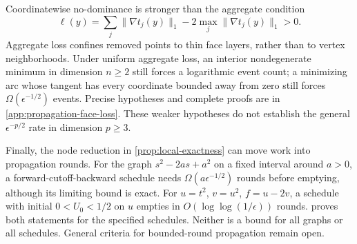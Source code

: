Coordinatewise no-dominance is stronger than the aggregate condition
\[
 \ell(y)=\sum_j\|\nabla t_j(y)\|_1
                  -2\max_j\|\nabla t_j(y)\|_1>0.
\]
Aggregate loss confines removed points to thin face layers, rather than
to vertex neighborhoods. Under uniform aggregate loss, an interior
nondegenerate minimum in dimension $n\ge2$ still forces a logarithmic
event count; a minimizing arc whose tangent has every coordinate bounded
away from zero still forces $\Omega(\epsilon^{-1/2})$ events. Precise
hypotheses and complete proofs are in \cref{app:propagation-face-loss}.
These weaker hypotheses do not establish the general
$\epsilon^{-p/2}$ rate in dimension $p\ge3$.

Finally, the node reduction in \cref{prop:local-exactness} can move work
into propagation rounds. For the graph $s^2-2as+a^2$ on a fixed interval
around $a>0$, a forward-cutoff-backward schedule needs
$\Omega(a\epsilon^{-1/2})$ rounds before emptying, although its limiting
bound is exact. For $u=t^2$, $v=u^2$, $f=u-2v$, a schedule with initial
$0<U_0<1/2$ on $u$ empties in $O(\log\log(1/\epsilon))$ rounds.
 proves both statements for the specified
schedules. Neither is a bound for all graphs or all schedules. General
criteria for bounded-round propagation remain open.
